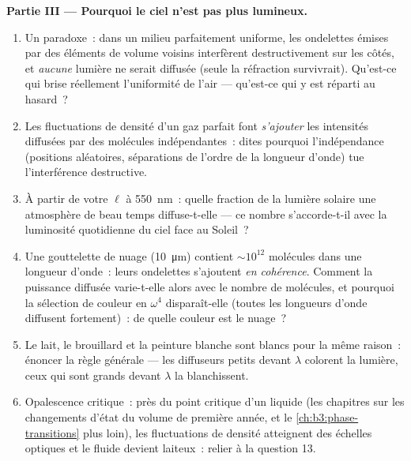 \begin{problem}
\medskip\noindent\textbf{Partie III --- Pourquoi le ciel n'est pas
plus lumineux.}
\begin{enumerate}[resume]
  \item Un paradoxe~: dans un milieu parfaitement uniforme, les
        ondelettes émises par des éléments de volume voisins
        interfèrent destructivement sur les côtés, et \emph{aucune}
        lumière ne serait diffusée (seule la réfraction survivrait).
        Qu'est-ce qui brise réellement l'uniformité de l'air ---
        qu'est-ce qui y est réparti au hasard~?
  \item Les fluctuations de densité d'un gaz parfait font
        \emph{s'ajouter} les intensités diffusées par des molécules
        indépendantes~: dites pourquoi l'indépendance (positions
        aléatoires, séparations de l'ordre de la longueur d'onde) tue
        l'interférence destructive.
  \item À partir de votre $\ell$ à \qty{550}{nm}~: quelle fraction de
        la lumière solaire une atmosphère de beau temps diffuse-t-elle
        --- ce nombre s'accorde-t-il avec la luminosité quotidienne du
        ciel face au Soleil~?
  \item Une gouttelette de nuage (\qty{10}{\micro m}) contient
        $\sim10^{12}$ molécules dans une longueur d'onde~: leurs
        ondelettes s'ajoutent \emph{en cohérence}. Comment la
        puissance diffusée varie-t-elle alors avec le nombre de
        molécules, et pourquoi la sélection de couleur en $\omega^4$
        disparaît-elle (toutes les longueurs d'onde diffusent
        fortement)~: de quelle couleur est le nuage~?
  \item Le lait, le brouillard et la peinture blanche sont blancs
        pour la même raison~: énoncer la règle générale --- les
        diffuseurs petits devant $\lambda$ colorent la lumière, ceux
        qui sont grands devant $\lambda$ la blanchissent.
  \item Opalescence critique~: près du point critique d'un liquide
        (les chapitres sur les changements d'état du volume de
        première année, et le \cref{ch:b3:phase-transitions} plus
        loin), les fluctuations de densité atteignent des échelles
        optiques et le fluide devient laiteux~: relier à la
        question 13.
\end{enumerate}


\end{problem}
